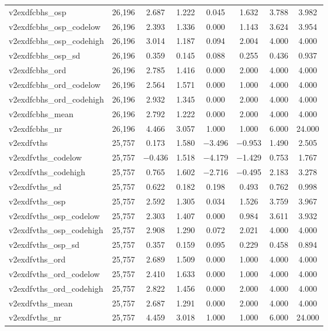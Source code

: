 \begin{table}[!htbp]
\begin{tabular}{@{\extracolsep{5pt}}lccccccc}
v2exdfcbhs\_osp & 26,196 & 2.687 & 1.222 & 0.045 & 1.632 & 3.788 & 3.982 \\ 
v2exdfcbhs\_osp\_codelow & 26,196 & 2.393 & 1.336 & 0.000 & 1.143 & 3.624 & 3.954 \\ 
v2exdfcbhs\_osp\_codehigh & 26,196 & 3.014 & 1.187 & 0.094 & 2.004 & 4.000 & 4.000 \\ 
v2exdfcbhs\_osp\_sd & 26,196 & 0.359 & 0.145 & 0.088 & 0.255 & 0.436 & 0.937 \\ 
v2exdfcbhs\_ord & 26,196 & 2.785 & 1.416 & 0.000 & 2.000 & 4.000 & 4.000 \\ 
v2exdfcbhs\_ord\_codelow & 26,196 & 2.564 & 1.571 & 0.000 & 1.000 & 4.000 & 4.000 \\ 
v2exdfcbhs\_ord\_codehigh & 26,196 & 2.932 & 1.345 & 0.000 & 2.000 & 4.000 & 4.000 \\ 
v2exdfcbhs\_mean & 26,196 & 2.792 & 1.222 & 0.000 & 2.000 & 4.000 & 4.000 \\ 
v2exdfcbhs\_nr & 26,196 & 4.466 & 3.057 & 1.000 & 1.000 & 6.000 & 24.000 \\ 
v2exdfvths & 25,757 & 0.173 & 1.580 & $-$3.496 & $-$0.953 & 1.490 & 2.505 \\ 
v2exdfvths\_codelow & 25,757 & $-$0.436 & 1.518 & $-$4.179 & $-$1.429 & 0.753 & 1.767 \\ 
v2exdfvths\_codehigh & 25,757 & 0.765 & 1.602 & $-$2.716 & $-$0.495 & 2.183 & 3.278 \\ 
v2exdfvths\_sd & 25,757 & 0.622 & 0.182 & 0.198 & 0.493 & 0.762 & 0.998 \\ 
v2exdfvths\_osp & 25,757 & 2.592 & 1.305 & 0.034 & 1.526 & 3.759 & 3.967 \\ 
v2exdfvths\_osp\_codelow & 25,757 & 2.303 & 1.407 & 0.000 & 0.984 & 3.611 & 3.932 \\ 
v2exdfvths\_osp\_codehigh & 25,757 & 2.908 & 1.290 & 0.072 & 2.021 & 4.000 & 4.000 \\ 
v2exdfvths\_osp\_sd & 25,757 & 0.357 & 0.159 & 0.095 & 0.229 & 0.458 & 0.894 \\ 
v2exdfvths\_ord & 25,757 & 2.689 & 1.509 & 0.000 & 1.000 & 4.000 & 4.000 \\ 
v2exdfvths\_ord\_codelow & 25,757 & 2.410 & 1.633 & 0.000 & 1.000 & 4.000 & 4.000 \\ 
v2exdfvths\_ord\_codehigh & 25,757 & 2.822 & 1.456 & 0.000 & 2.000 & 4.000 & 4.000 \\ 
v2exdfvths\_mean & 25,757 & 2.687 & 1.291 & 0.000 & 2.000 & 4.000 & 4.000 \\ 
v2exdfvths\_nr & 25,757 & 4.459 & 3.018 & 1.000 & 1.000 & 6.000 & 24.000 \\ 

\end{tabular}
\end{table}
